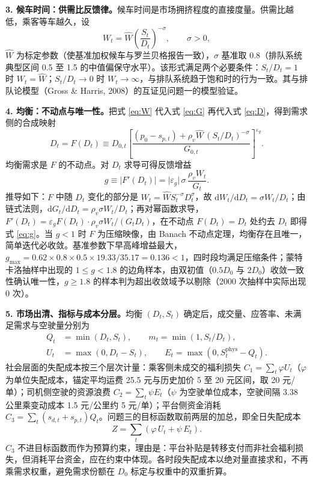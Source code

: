 \documentclass[12pt,a4paper]{ctexart}
\begin{document}
\textbf{3. 候车时间：供需比反馈律。}候车时间是市场拥挤程度的直接度量。供需比越低，乘客等车越久，设
\begin{equation}
W_t = \hat{W}\left(\frac{S_t}{D_t}\right)^{-\sigma}, \qquad \sigma > 0 , \label{eq:W}
\end{equation}
$\hat{W}$ 为标定参数（使基准加权候车与罗兰贝格报告一致），$\sigma$ 基准取 0.8（排队系统典型区间 0.5 至 1.5 的中值偏保守水平）。该形式满足两个必要条件：$S_t/D_t=1$ 时 $W_t=\hat{W}$；$S_t/D_t\to 0$ 时 $W_t\to\infty$，与排队系统趋于饱和时的行为一致。其与排队论模型（Gross \& Harris, 2008）的互证见问题一的模型验证。

\textbf{4. 均衡：不动点与唯一性。}把式 \eqref{eq:W} 代入式 \eqref{eq:G} 再代入式 \eqref{eq:D}，得到需求侧的合成映射
\begin{equation}
D_t = F(D_t) \equiv D_{0,t}\left[\frac{(p_0-s_{p,t}) + \rho_v \hat{W}\,(S_t/D_t)^{-\sigma}}{G_{0,t}}\right]^{\varepsilon_g} . \label{eq:fp}
\end{equation}
均衡需求是 $F$ 的不动点。对 $D_t$ 求导可得反馈增益
\begin{equation}
g \equiv \left|F'(D_t)\right| = \lvert\varepsilon_g\rvert\,\sigma\,\frac{\rho_v W_t}{G_t} . \label{eq:g}
\end{equation}
推导如下：$F$ 中随 $D_t$ 变化的部分是 $W_t=\hat{W}S_t^{-\sigma}D_t^{\sigma}$，故 $\mathrm{d}W_t/\mathrm{d}D_t=\sigma W_t/D_t$；由链式法则，$\mathrm{d}G_t/\mathrm{d}D_t=\rho_v\sigma W_t/D_t$；再对幂函数求导，$F'(D_t)=\varepsilon_g F(D_t)\cdot\rho_v\sigma W_t/(G_t D_t)$，在不动点 $F(D_t)=D_t$ 处约去 $D_t$ 即得式 \eqref{eq:g}。当 $g<1$ 时 $F$ 为压缩映像，由 Banach 不动点定理，均衡存在且唯一，简单迭代必收敛。基准参数下早高峰增益最大，$g_{\max}=0.62\times0.8\times0.5\times19.33/35.17=0.136<1$，四时段均满足压缩条件；蒙特卡洛抽样中出现的 $1\le g<1.8$ 的边角样本，由双初值（$0.5D_0$ 与 $2D_0$）收敛一致性确认唯一性，$g\ge1.8$ 的样本判为超出收敛域予以剔除（2000 次抽样中实际出现 0 次）。

\textbf{5. 市场出清、指标与成本分层。}均衡 $(D_t,S_t)$ 确定后，成交量、应答率、未满足需求与空驶量分别为
\begin{equation}
\begin{aligned}
Q_t&=\min(D_t,S_t),\qquad m_t=\min(1,S_t/D_t),\\
U_t&=\max(0,D_t-S_t),\qquad E_t=\max(0,S_t^{\mathrm{phys}}-Q_t) .
\end{aligned}\label{eq:clear}
\end{equation}
社会层面的失配成本按三个层次计量：乘客侧未成交的福利损失 $C_1=\sum_t\varphi U_t$（$\varphi$ 为单位失配成本，锚定平均运费 25.5 元与历史加价 5 至 20 元区间，取 20 元/单）；司机侧空驶的资源浪费 $C_2=\sum_t\psi E_t$（$\psi$ 为空驶单位成本，空驶间隔 3.38 公里乘变动成本 1.5 元/公里约 5 元/单）；平台侧资金消耗 $C_3=\sum_t(s_{d,t}+s_{p,t})Q_t$。问题三的目标函数取前两层的加总，即全日失配成本
\begin{equation}
Z = \sum_{t}\left(\varphi\,U_t + \psi\,E_t\right) . \label{eq:Z}
\end{equation}
$C_3$ 不进目标函数而作为预算约束，理由是：平台补贴是转移支付而非社会福利损失，但消耗平台资金，应在约束中体现。各时段失配成本以绝对量直接求和，不再乘需求权重，避免需求份额在 $D_0$ 标定与权重中的双重折算。
\end{document}

